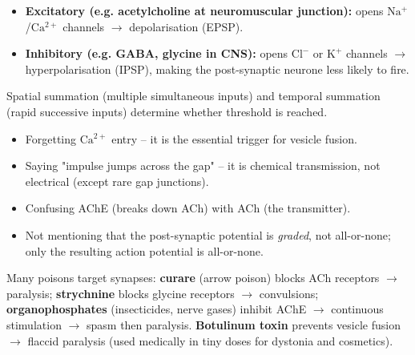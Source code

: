 \documentclass[11pt]{article}
\newcommand{\cle}[1]{{\popxbold\color{popdark}#1}}
\begin{document}
\begin{propriete}
\begin{itemize}
\item \textbf{Excitatory (e.g. acetylcholine at neuromuscular junction):} opens $\mathrm{Na^{+}}$/$\mathrm{Ca^{2+}}$ channels $\rightarrow$ depolarisation (EPSP).
\item \textbf{Inhibitory (e.g. GABA, glycine in CNS):} opens $\mathrm{Cl^{-}}$ or $\mathrm{K^{+}}$ channels $\rightarrow$ hyperpolarisation (IPSP), making the post-synaptic neurone less likely to fire.
\end{itemize}
\cle{Spatial summation} (multiple simultaneous inputs) and \cle{temporal summation} (rapid successive inputs) determine whether threshold is reached.
\end{propriete}

\begin{attention}
\begin{itemize}
\item Forgetting $\mathrm{Ca^{2+}}$ entry -- it is the essential trigger for vesicle fusion.
\item Saying "impulse jumps across the gap" -- it is chemical transmission, not electrical (except rare gap junctions).
\item Confusing AChE (breaks down ACh) with ACh (the transmitter).
\item Not mentioning that the post-synaptic potential is \emph{graded}, not all-or-none; only the resulting action potential is all-or-none.
\end{itemize}
\end{attention}

\begin{savaistu}
Many poisons target synapses: \textbf{curare} (arrow poison) blocks ACh receptors $\rightarrow$ paralysis; \textbf{strychnine} blocks glycine receptors $\rightarrow$ convulsions; \textbf{organophosphates} (insecticides, nerve gases) inhibit AChE $\rightarrow$ continuous stimulation $\rightarrow$ spasm then paralysis. \textbf{Botulinum toxin} prevents vesicle fusion $\rightarrow$ flaccid paralysis (used medically in tiny doses for dystonia and cosmetics).
\end{savaistu}
\end{document}
